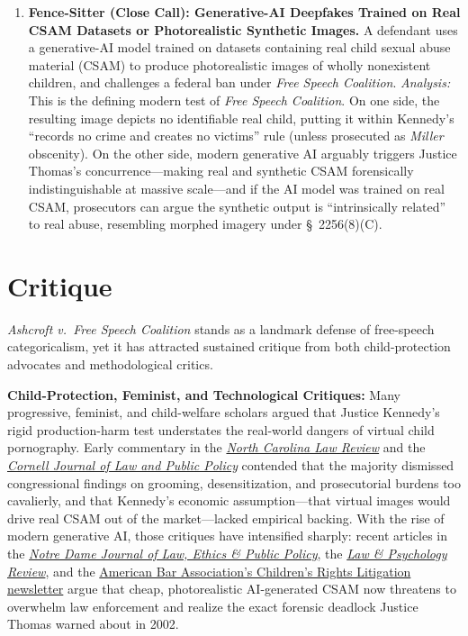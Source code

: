 \documentclass[12pt]{article}
\begin{document}
\begin{enumerate}
\item \textbf{Fence-Sitter (Close Call): Generative-AI Deepfakes Trained on Real CSAM Datasets or Photorealistic Synthetic Images.} A defendant uses a generative-AI model trained on datasets containing real child sexual abuse material (CSAM) to produce photorealistic images of wholly nonexistent children, and challenges a federal ban under \textit{Free Speech Coalition}. \textit{Analysis:} This is the defining modern test of \textit{Free Speech Coalition}. On one side, the resulting image depicts no identifiable real child, putting it within Kennedy's ``records no crime and creates no victims'' rule (unless prosecuted as \textit{Miller} obscenity). On the other side, modern generative AI arguably triggers Justice Thomas's concurrence---making real and synthetic CSAM forensically indistinguishable at massive scale---and if the AI model was trained on real CSAM, prosecutors can argue the synthetic output is ``intrinsically related'' to real abuse, resembling morphed imagery under \S~2256(8)(C).
\end{enumerate}

\section{Critique}

\textit{Ashcroft v.\ Free Speech Coalition} stands as a landmark defense of free-speech categoricalism, yet it has attracted sustained critique from both child-protection advocates and methodological critics.

\textbf{Child-Protection, Feminist, and Technological Critiques:} Many progressive, feminist, and child-welfare scholars argued that Justice Kennedy's rigid production-harm test understates the real-world dangers of virtual child pornography. Early commentary in the \href{https://scholarship.law.unc.edu/cgi/viewcontent.cgi?article=4081&context=nclr}{\textit{North Carolina Law Review}} and the \href{https://scholarship.law.cornell.edu/cgi/viewcontent.cgi?article=1126&context=cjlpp}{\textit{Cornell Journal of Law and Public Policy}} contended that the majority dismissed congressional findings on grooming, desensitization, and prosecutorial burdens too cavalierly, and that Kennedy's economic assumption---that virtual images would drive real CSAM out of the market---lacked empirical backing. With the rise of modern generative AI, those critiques have intensified sharply: recent articles in the \href{https://scholarship.law.nd.edu/cgi/viewcontent.cgi?article=1970&context=ndjlepp}{\textit{Notre Dame Journal of Law, Ethics \& Public Policy}}, the \href{https://law.ua.edu/wp-content/uploads/2026/06/48LawPsycholRev169.pdf}{\textit{Law \& Psychology Review}}, and the \href{https://www.americanbar.org/groups/litigation/resources/newsletters/childrens-rights/when-image-is-fake-harm-real/}{American Bar Association's Children's Rights Litigation newsletter} argue that cheap, photorealistic AI-generated CSAM now threatens to overwhelm law enforcement and realize the exact forensic deadlock Justice Thomas warned about in 2002.
\end{document}
